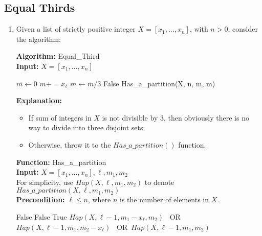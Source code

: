 \documentclass[10pt]{article}
\newcommand{\oor}{\mbox{ OR }}
\begin{document}
\subsection*{Equal Thirds}
\begin{enumerate}[label=(\alph*)]
	\item Given a list of strictly positive integer $X=[x_1,...,x_n]$, with $n>0$,
    consider the algorithm: 
    \begin{algorithm}
      \textbf{Algorithm:} Equal\_Third\\
      \textbf{Input:} $X=[x_1, ..., x_n]$\\
      \begin{algorithmic}[1]
        \State $m\gets 0$
          \State $m += x_\ell$
        \EndFor
        \State $m\gets m/3$
          \State \Return False
        \EndIf
          \State \Return Has\_a\_partition(X, n, m, m)
      \end{algorithmic}
      \textbf{Explanation:}
      \begin{itemize}
        \item If sum of integers in $X$ is not divisible by 3, then obviously
          there is no way to divide into three disjoint sets. 
        \item Otherwise, throw it to the $Has\_a\_partition()$ function.
      \end{itemize}
    \end{algorithm}
    \begin{algorithm}
      \textbf{Function:} Has\_a\_partition\\
      \textbf{Input:} $X=[x_1, ..., x_n], \ell, m_1, m_2$\\
      For simplicity, use $Hap(X, \ell, m_1, m_2)$ to denote
      $Has\_a\_partition(X, \ell, m_1, m_2)$\\ 
      \textbf{Precondition:} $\ell \leq n$, where $n$ is the number of elements in $X$.\\
      \begin{algorithmic}[1]
        \If{$m_1 <0 \oor m_2<0$}
          \State \Return False 
        \EndIf
          \If{$m_1 \neq 0 \oor m_2 \neq 0$}
            \State \Return False
          \Else
            \State \Return True
          \EndIf
        \Else
          \State \Return $Hap(X,\ell-1, m_1-x_\ell, m_2)$ \oor $Hap(X, \ell-1,
            m_1, m_2-x_\ell)$ \oor $Hap(X,\ell-1, m_1, m_2)$ 
        \EndIf
      \end{algorithmic}

\end{algorithm}
\end{enumerate}
\end{document}
